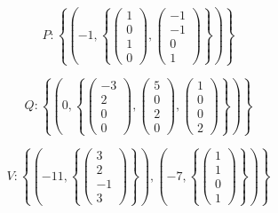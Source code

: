 \documentclass[12pt, a4paper]{article}
\begin{document}
    \begin{equation}
        P: \left\{ 
            \left(-1, \left\{\begin{pmatrix} 1\\0\\1\\0 \end{pmatrix}, \begin{pmatrix} -1\\-1\\0\\1 \end{pmatrix} \right\} \right)
        \right\}
    \end{equation}
    
    \begin{equation}
        Q: \left\{ 
            \left(0, \left\{\begin{pmatrix} -3\\2\\0\\0 \end{pmatrix}, \begin{pmatrix} 5\\0\\2\\0 \end{pmatrix}, \begin{pmatrix} 1\\0\\0\\2 \end{pmatrix} \right\} \right)
        \right\}
    \end{equation}
    
    \begin{equation}
        V: \left\{ 
            \left(-11, \left\{\begin{pmatrix} 3\\2\\-1\\3 \end{pmatrix} \right\} \right),
            \left(-7, \left\{\begin{pmatrix} 1\\1\\0\\1 \end{pmatrix} \right\} \right)
        \right\}
    \end{equation}
    
\end{document}
